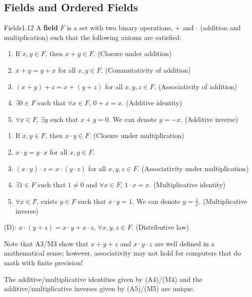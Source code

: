 \subsection{Fields and Ordered Fields}
\begin{definition}{Fields}{1.12}
    A \textbf{field} $F$ is a set with two binary operations, $+$ and $\cdot$ (addition and multiplication) such that the following axioms are satisfied:
    \begin{enumerate}[start=1, label={(A\arabic*):}]
    \item If $x, y \in F$, then $x + y \in F$. (Closure under addition)
    \item $x + y = y + x$ for all $x, y \in F$. (Commutativity of addition)
    \item $(x+y) + z = x + (y + z)$ for all $x, y, z \in F$. (Associativity of addition)
    \item $\exists 0 \in F$ such that $\forall x \in F$, $0 + x = x$. (Additive identity)
    \item $\forall x \in F$, $\exists y$ such that $x + y = 0$. We can denote $y = -x$. (Additive inverse)
    \end{enumerate}
    \begin{enumerate}[start=1, label={(M\arabic*):}]
        \item If $x, y \in F$, then $x\cdot y\in F$. (Closure under multiplication)
        \item $x \cdot y = y \cdot x$ for all $x, y \in F$.
        \item $(x\cdot y)\cdot z = x \cdot (y \cdot z)$ for all $x, y, z \in F$. (Associativity under multiplication)
        \item $\exists 1 \in F$ such that $1 \neq 0$ and $\forall x \in F$, $1 \cdot x = x$. (Multiplicative identity)
        \item $\forall x \in F$, exists $y \in F$ such that $x \cdot y = 1$. We can denote $y = \frac{1}{x}$. (Multiplicative inverse)
    \end{enumerate}
    (D): $x \cdot (y + z) = x \cdot y + x \cdot z$, $\forall x, y, z \in F$. (Distributive law)
\end{definition}
\noindent Note that A3/M3 show that $x + y + z$ and $x\cdot y\cdot z$ are well defined in a mathematical sense; however, associativity may not hold for computers that do math with finite precision! 
\begin{ntheorem}{}
    The additive/multiplicative identities given by (A4)/(M4) and the additive/multiplicative inverses given by (A5)/(M5) are unique. 
\end{ntheorem}
